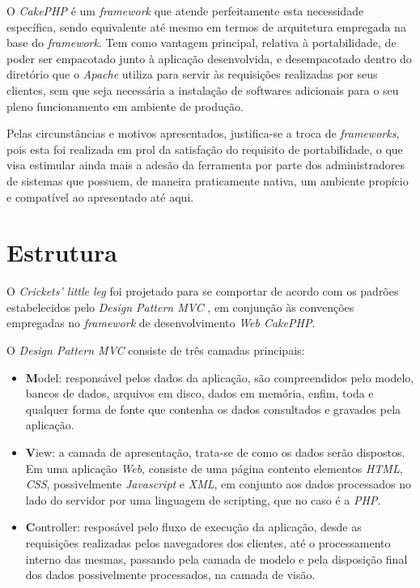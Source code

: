 O \textit{CakePHP} é um \textit{framework} que atende perfeitamente esta necessidade específica, sendo equivalente até mesmo em termos de arquitetura empregada na base do \textit{framework}. Tem como vantagem principal, relativa à portabilidade, de poder ser empacotado junto à aplicação desenvolvida, e desempacotado dentro do diretório que o \textit{Apache} utiliza para servir às requisições realizadas por seus clientes, sem que seja necessária a instalação de softwares adicionais para o seu pleno funcionamento em ambiente de produção.

Pelas circunstâncias e motivos apresentados, justifica-se a troca de \textit{frameworks}, pois esta foi realizada em prol da satisfação do requisito de portabilidade, o que visa estimular ainda mais a adesão da ferramenta por parte dos administradores de sistemas que possuem, de maneira praticamente nativa, um ambiente propício e compatível ao apresentado até aqui.

\section{Estrutura}

O \textit{Crickets' little leg} foi projetado para se comportar de acordo com os padrões estabelecidos pelo \textit{Design Pattern MVC} \cite{MVC}, em conjunção às convenções empregadas no \textit{framework} de desenvolvimento \textit{Web CakePHP}.

O \textit{Design Pattern MVC} consiste de três camadas principais:
\begin{itemize}
    \item \textbf{M}odel: responsável pelos dados da aplicação, são compreendidos pelo modelo, bancos de dados, arquivos em disco, dados em memória, enfim, toda e qualquer forma de fonte que contenha os dados consultados e gravados pela aplicação.

    \item \textbf{V}iew: a camada de apresentação, trata-se de como os dados serão dispostos. Em uma aplicação \textit{Web}, consiste de uma página contento elementos \textit{HTML}, \textit{CSS}, possivelmente \textit{Javascript} e \textit{XML}, em conjunto aos dados processados no lado do servidor por uma linguagem de scripting, que no caso é a \textit{PHP}.

    \item \textbf{C}ontroller: resposável pelo fluxo de execução da aplicação, desde as requisições realizadas pelos navegadores dos clientes, até o processamento interno das mesmas, passando pela camada de modelo e pela disposição final dos dados possivelmente processados, na camada de visão.
\end{itemize}

